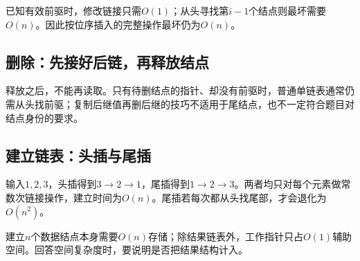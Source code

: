 \hypertarget{ds2-linked-insert-cost}{}

已知有效前驱时，修改链接只需$O(1)$；从头寻找第$i-1$个结点则最坏需要$O(n)$。因此按位序插入的完整操作最坏仍为$O(n)$。


\hypertarget{ds2-linked-delete}{}

\subsection{删除：先接好后链，再释放结点}\label{ds2-linked-delete}

\hypertarget{ds2-linked-delete-code}{}

\Needspace{153.6pt}

\hypertarget{ds2-delete-pitfall}{}

\begin{pitfall}[删除的前提]
释放之后，不能再读取。只有待删结点的指针、却没有前驱时，普通单链表通常仍需从头找前驱；复制后继值再删后继的技巧不适用于尾结点，也不一定符合题目对结点身份的要求。
\end{pitfall}

\hypertarget{ds2-build}{}

\subsection{建立链表：头插与尾插}\label{ds2-build}

\hypertarget{ds2-head-build}{}

\Needspace{105.6pt}

\hypertarget{ds2-tail-build}{}

\Needspace{124.8pt}

\hypertarget{ds2-build-order}{}

输入$1,2,3$，头插得到$3\to2\to1$，尾插得到$1\to2\to3$。两者均只对每个元素做常数次链接操作，建立时间为$O(n)$。尾插若每次都从头找尾部，才会退化为$O(n^2)$。


\hypertarget{ds2-build-space}{}

建立$n$个数据结点本身需要$O(n)$存储；除结果链表外，工作指针只占$O(1)$辅助空间。回答空间复杂度时，要说明是否把结果结构计入。


\hypertarget{ds2-destroy}{}

\Needspace{115.2pt}

